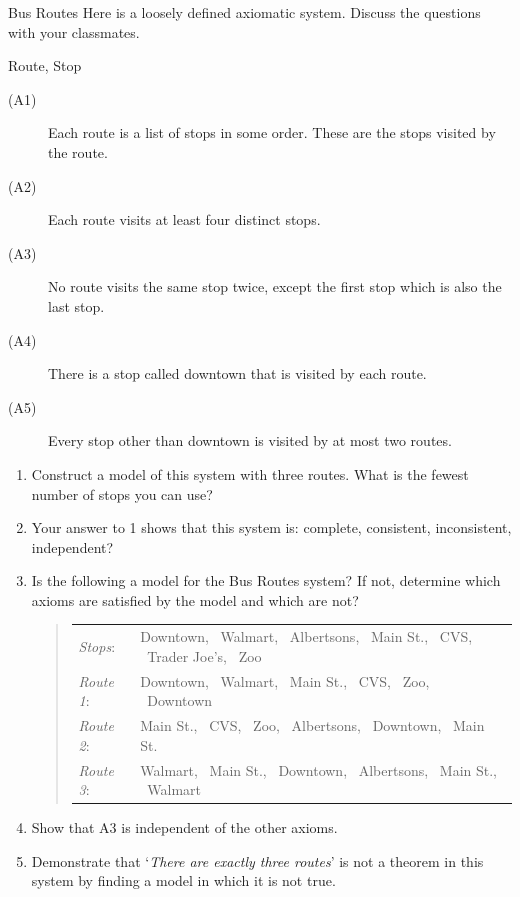 \begin{example}{Bus Routes}{}
	Here is a loosely defined axiomatic system. Discuss the questions with your classmates.
	\begin{description}\itemsep0pt
		\item[\normalfont\emph{Undefined Terms}:] Route, Stop
		\item[\normalfont\emph{Axioms}:]
		\begin{description}
			\item[\normalfont (A1)] Each route is a list of stops in some order. These are the stops visited by the route.
			\item[\normalfont (A2)] Each route visits at least four distinct stops.
			\item[\normalfont (A3)] No route visits the same stop twice, except the first stop which is also the last stop.
			\item[\normalfont (A4)] There is a stop called downtown that is visited by each route.
			\item[\normalfont (A5)] Every stop other than downtown is visited by at most two routes.
		\end{description}
	\end{description}
	
	\begin{enumerate}
	  \item Construct a model of this system with three routes. What is the fewest number of stops you can use?
	  \item Your answer to 1 shows that this system is: complete, consistent, inconsistent, independent?
	  \item Is the following a model for the Bus Routes system? If not, determine which axioms are satisfied by the model and which are not?
	  \begin{quote}\def\arraystretch{1.2}
		  \begin{tabular}{@{}ll}
		    \emph{Stops}:&Downtown, \ Walmart, \ Albertsons, \ Main St., \ CVS, \ Trader Joe's, \ Zoo\\
		  	\emph{Route 1}:&Downtown, \ Walmart, \ Main St., \ CVS, \ Zoo, \ Downtown\\
		  	\emph{Route 2}:&Main St., \ CVS, \ Zoo, \ Albertsons, \ Downtown, \ Main St.\\
		  	\emph{Route 3}:&Walmart, \ Main St., \ Downtown, \ Albertsons, \ Main St., \ Walmart
		  \end{tabular}
	  \end{quote}
		\item Show that A3 is independent of the other axioms.
		\item Demonstrate that `\emph{There are exactly three routes}' is not a theorem in this system by finding a model in which it is not true.
	\end{enumerate}
\end{example}


